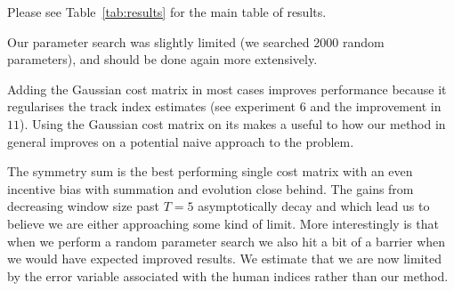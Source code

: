 \documentclass[twocolumn]{article}
\begin{document}
Please see Table~\ref{tab:results} for the main table of results.

Our parameter search was slightly limited (we searched $2000$ random parameters), and should be done again more extensively. 

Adding the Gaussian cost matrix in most cases improves performance because it regularises the track index estimates (see experiment $6$ and the improvement in $11$). Using the Gaussian cost matrix on its makes a useful to how our method in general improves on a potential naive approach to the problem. 

The symmetry sum is the best performing single cost matrix with an even incentive bias with summation and evolution close behind. The gains from decreasing window size past $T=5$ asymptotically decay and which lead us to believe we are either approaching some kind of limit. More interestingly is that when we perform a random parameter search we also hit a bit of a barrier when we would have expected improved results. We estimate that we are now limited by the error variable associated with the human indices rather than our method. 
\end{document}
